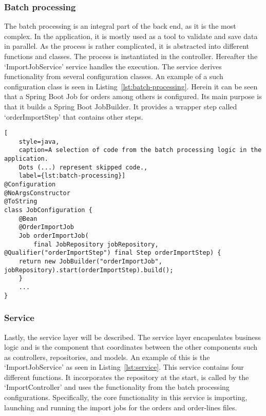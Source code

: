 \subsubsection{Batch processing}

The batch processing is an integral part of the back end, as it is the most complex.
In the application, it is mostly used as a tool to validate and save data in parallel.
As the process is rather complicated, it is abstracted into different functions and classes.
The process is instantiated in the controller.
Hereafter the `ImportJobService' service handles the execution.
The service derives functionality from several configuration classes.
An example of a such configuration class is seen in Listing~\ref{lst:batch-processing}.
Herein it can be seen that a Spring Boot Job for orders among others is configured.
Its main purpose is that it builds a Spring Boot JobBuilder.
It provides a wrapper step called `orderImportStep' that contains other steps.

\begin{lstlisting}[
    style=java,
    caption=A selection of code from the batch processing logic in the application.
    Dots (...) represent skipped code.,
    label={lst:batch-processing}]
@Configuration
@NoArgsConstructor
@ToString
class JobConfiguration {
    @Bean
    @OrderImportJob
    Job orderImportJob(
        final JobRepository jobRepository, @Qualifier("orderImportStep") final Step orderImportStep) {
    return new JobBuilder("orderImportJob", jobRepository).start(orderImportStep).build();
    }
    ...
}
\end{lstlisting}

\subsubsection{Service}

Lastly, the service layer will be described.
The service layer encapsulates business logic and is the component that coordinates between the other components such as
controllers, repositories, and models.
An example of this is the `ImportJobService' as seen in Listing~\ref{lst:service}.
This service contains four different functions.
It incorporates the repository at the start, is called by the `ImportController' and uses the functionality from the
batch processing configurations.
Specifically, the core functionality in this service is importing, launching and running the import jobs for the
orders and order-lines files.

